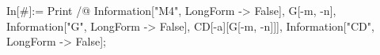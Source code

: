 In[\#]:= Print /@ {Information["M4", LongForm -> False], G[-m, -n], Information["G", LongForm -> False], CD[-a][G[-m, -n]]], Information["CD", LongForm -> False]}; 